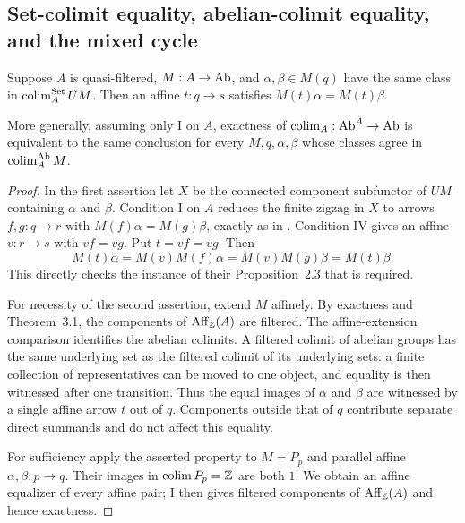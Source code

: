 \subsection{Set-colimit equality, abelian-colimit equality, and the mixed cycle}

\begin{theorem}\label{B:lead4}
Suppose $A$ is quasi-filtered, $M:A\to\mathrm{Ab}$, and $\alpha,\beta\in M(q)$ have the same class in $\operatorname*{colim}_A^{\mathrm{Set}}UM$. Then an affine $t:q\to s$ satisfies $M(t)\alpha=M(t)\beta$.

More generally, assuming only I on $A$, exactness of $\operatorname*{colim}_A:\mathrm{Ab}^A\to\mathrm{Ab}$ is equivalent to the same conclusion for every $M,q,\alpha,\beta$ whose classes agree in $\operatorname*{colim}_A^{\mathrm{Ab}}M$.
\end{theorem}
\begin{proof}
In the first assertion let $X$ be the connected component subfunctor of $UM$ containing $\alpha$ and $\beta$. Condition I on $A$ reduces the finite zigzag in $X$ to arrows $f,g:q\to r$ with $M(f)\alpha=M(g)\beta$, exactly as in \citet[Lemma~2.2]{IsbellMitchell1976}. Condition IV gives an affine $v:r\to s$ with $vf=vg$. Put $t=vf=vg$. Then
\[
 M(t)\alpha=M(v)M(f)\alpha=M(v)M(g)\beta=M(t)\beta.
\]
This directly checks the instance of their Proposition~2.3 that is required.

For necessity of the second assertion, extend $M$ affinely. By exactness and Theorem~3.1, the components of $\operatorname{Aff}_\mathbb Z(A)$ are filtered. The affine-extension comparison identifies the abelian colimits. A filtered colimit of abelian groups has the same underlying set as the filtered colimit of its underlying sets: a finite collection of representatives can be moved to one object, and equality is then witnessed after one transition. Thus the equal images of $\alpha$ and $\beta$ are witnessed by a single affine arrow $t$ out of $q$. Components outside that of $q$ contribute separate direct summands and do not affect this equality.

For sufficiency apply the asserted property to $M=P_p$ and parallel affine $\alpha,\beta:p\to q$. Their images in $\operatorname*{colim} P_p=\mathbb Z$ are both $1$. We obtain an affine equalizer of every affine pair; I then gives filtered components of $\operatorname{Aff}_\mathbb Z(A)$ and hence exactness.
\end{proof}

